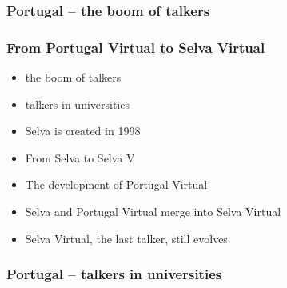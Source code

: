 \documentclass[aspectratio=169]{beamer}
\begin{document}
\begin{frame}
\frametitle{Portugal -- the boom of talkers}
\end{frame}

\begin{frame}
\frametitle{From Portugal Virtual to Selva Virtual}
  \begin{itemize}
    \item{} the boom of talkers
    \item{} talkers in universities
    \item{} Selva is created in 1998
    \item{} From Selva to Selva V
    \item{} The development of Portugal Virtual
    \item{} Selva and Portugal Virtual merge into Selva Virtual
    \item{} Selva Virtual, the last talker, still evolves
  \end{itemize}
\end{frame}

\begin{frame}
\frametitle{Portugal -- talkers in universities}
\end{frame}
\end{document}
